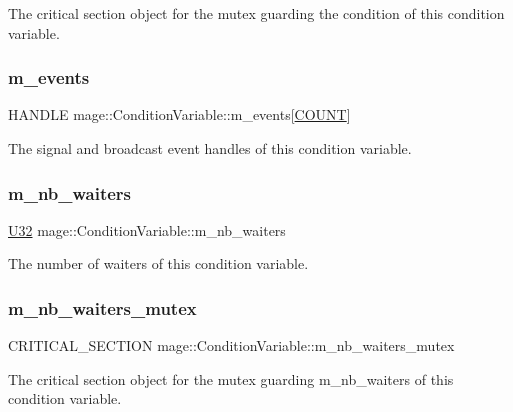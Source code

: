 The critical section object for the mutex guarding the condition of this condition variable. \hypertarget{classmage_1_1_condition_variable_a00691d5e29735da356f577bb5522017d}{}\label{classmage_1_1_condition_variable_a00691d5e29735da356f577bb5522017d} 
\subsubsection{\texorpdfstring{m\+\_\+events}{m\_events}}
{\footnotesize\ttfamily H\+A\+N\+D\+LE mage\+::\+Condition\+Variable\+::m\+\_\+events\mbox{[}\hyperlink{classmage_1_1_condition_variable_ae7627253bf4faebc0aae84a77920d195a553680ab09f088489b7d9f3cef9a5e14}{C\+O\+U\+NT}\mbox{]}\hspace{0.3cm}{\ttfamily [private]}}

The signal and broadcast event handles of this condition variable. \hypertarget{classmage_1_1_condition_variable_a1166a25b69eb4b510b551c6c74a13046}{}\label{classmage_1_1_condition_variable_a1166a25b69eb4b510b551c6c74a13046} 
\subsubsection{\texorpdfstring{m\+\_\+nb\+\_\+waiters}{m\_nb\_waiters}}
{\footnotesize\ttfamily \hyperlink{namespacemage_a41c104c036fba3756a74e19f793eeaa1}{U32} mage\+::\+Condition\+Variable\+::m\+\_\+nb\+\_\+waiters\hspace{0.3cm}{\ttfamily [private]}}

The number of waiters of this condition variable. \hypertarget{classmage_1_1_condition_variable_a0686e682d62d44ff1eb9ac45acbb0eab}{}\label{classmage_1_1_condition_variable_a0686e682d62d44ff1eb9ac45acbb0eab} 
\subsubsection{\texorpdfstring{m\+\_\+nb\+\_\+waiters\+\_\+mutex}{m\_nb\_waiters\_mutex}}
{\footnotesize\ttfamily C\+R\+I\+T\+I\+C\+A\+L\+\_\+\+S\+E\+C\+T\+I\+ON mage\+::\+Condition\+Variable\+::m\+\_\+nb\+\_\+waiters\+\_\+mutex\hspace{0.3cm}{\ttfamily [private]}}

The critical section object for the mutex guarding {\ttfamily m\+\_\+nb\+\_\+waiters} of this condition variable. 